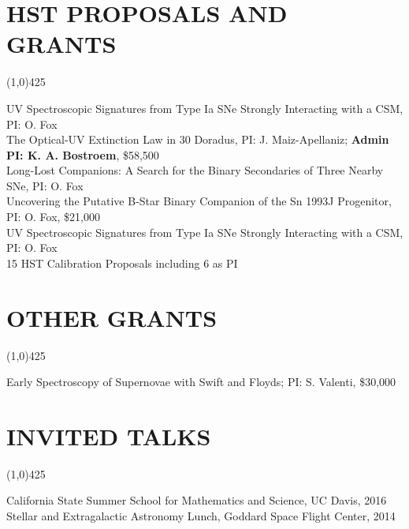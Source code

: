 \documentclass{res}
\begin{document}
\begin{resume}
\section{HST PROPOSALS AND GRANTS}
\vspace{-.2in} 
\begin{center}
\line(1,0){425}
\end{center}
\vspace{-.25in} 
\vspace{0.1in}
UV Spectroscopic Signatures from Type Ia SNe Strongly Interacting with a CSM, PI: O. Fox \\
The Optical-UV Extinction Law in 30 Doradus, PI: J. Maiz-Apellaniz; {\bf Admin PI: K. A. Bostroem},  \$58,500 \\
Long-Lost Companions: A Search for the Binary Secondaries of Three Nearby SNe, PI: O. Fox\\
Uncovering the Putative B-Star Binary Companion of the Sn 1993J Progenitor, PI: O. Fox, \$21,000 \\
UV Spectroscopic Signatures from Type Ia SNe Strongly Interacting with a CSM, PI: O. Fox \\
15 HST Calibration Proposals including 6 as PI
%
\section{OTHER GRANTS}
\vspace{-.2in} 
\begin{center}
\line(1,0){425}
\end{center}
\vspace{-.25in} 
\vspace{0.1in}
Early Spectroscopy of Supernovae with Swift and Floyds; PI: S. Valenti, \$30,000 \\
%
\section{INVITED TALKS}
\vspace{-.2in} 
\begin{center}
\line(1,0){425}
\end{center}
\vspace{-.25in} 
\vspace{0.1in}
California State Summer School for Mathematics and Science, UC Davis, 2016\\
Stellar and Extragalactic Astronomy Lunch, Goddard Space Flight Center, 2014
%

\end{resume}
\end{document}
